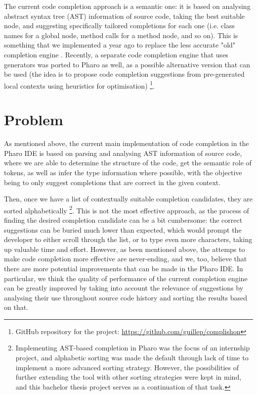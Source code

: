 The current code completion approach is a semantic one: it is based on analysing abstract syntax tree (AST) information of source code, taking the best suitable node, and suggesting specifically tailored completions for each one (i.e. class names for a global node, method calls for a method node, and so on). This is something that we implemented a year ago to replace the less accurate "old" completion engine . Recently, a separate code completion engine that uses generators was ported to Pharo as well, as a possible alternative version that can be used (the idea is to propose code completion suggestions from pre-generated local contexts using heuristics for optimisation) \footnote{GitHub repository for the project: \url{https://github.com/guillep/complishon}}.

\section{Problem}
\label{sec:Introduction-Problem}
As mentioned above, the current main implementation of code completion in the Pharo IDE is based on parsing and analysing AST information of source code, where we are able to determine the structure of the code, get the semantic role of tokens, as well as infer the type information where possible, with the objective being to only suggest completions that are correct in the given context.

Then, once we have a list of contextually suitable completion candidates, they are sorted alphabetically \footnote{Implementing AST-based completion in Pharo was the focus of an internship project, and alphabetic sorting was made the default through lack of time to implement a more advanced sorting strategy. However, the possibilities of further extending the tool with other sorting strategies were kept in mind, and this bachelor thesis project serves as a continuation of that task.}. This is not the most effective approach, as the process of finding the desired completion candidate can be a bit cumbersome: the correct suggestions can be buried much lower than expected, which would prompt the developer to either scroll through the list, or to type even more characters, taking up valuable time and effort. However, as been mentioned above, the attemps to make code completion more effective are never-ending, and we, too, believe that there are more potential improvements that can be made in the Pharo IDE. In particular, we think the quality of performance of the current completion engine can be greatly improved by taking into account the relevance of suggestions by analysing their use throughout source code history and sorting the results based on that.

